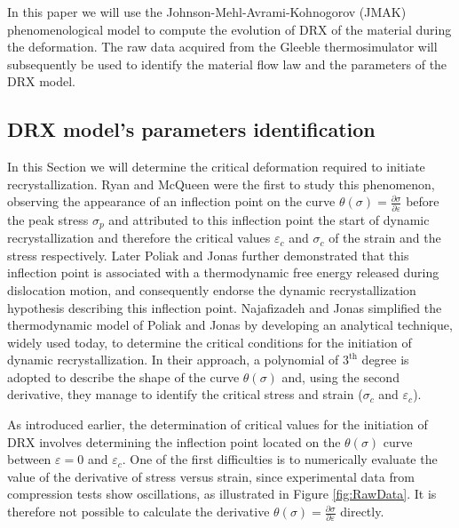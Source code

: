 \documentclass[metals,article,submit,pdftex,moreauthors]{Definitions/mdpi}
\begin{document}
In this paper we will use the Johnson-Mehl-Avrami-Kohnogorov (JMAK) phenomenological model \cite{Avrami-1939} to compute the evolution of DRX of the material during the deformation.
The raw data acquired from the Gleeble thermosimulator will subsequently be used to identify the material flow law and the parameters of the DRX model.

\subsection{DRX model's parameters identification\label{subsec:DRXParameters}}

In this Section we will determine the critical deformation required to initiate recrystallization.
Ryan and McQueen \cite{Ryan-1989, Ryan-1990, Ryan-1990-2} were the first to study this phenomenon, observing the appearance of an inflection point on the curve $\theta(\sigma)=\frac{\partial \sigma}{\partial \varepsilon}$ before the peak stress $\sigma_p$ and attributed to this inflection point the start of dynamic recrystallization and therefore the critical values $\varepsilon_c$ and $\sigma_c$ of the strain and the stress respectively.
Later Poliak and Jonas \cite{Poliak-1996, Poliak-2003, Poliak-2003-2, Jonas-2003} further demonstrated that this inflection point is associated with a thermodynamic free energy released during dislocation motion, and consequently endorse the dynamic recrystallization hypothesis describing this inflection point.
Najafizadeh and Jonas \cite{Najafizadeh-2006} simplified the thermodynamic model of Poliak and Jonas by developing an analytical technique, widely used today, to determine the critical conditions for the initiation of dynamic recrystallization.
In their approach, a polynomial of $3^\text{th}$ degree is adopted to describe the shape of the curve $\theta(\sigma)$ and, using the second derivative, they manage to identify the critical stress and strain ($\sigma_c$ and $\varepsilon_c$).

As introduced earlier, the determination of critical values for the initiation of DRX involves determining the inflection point located on the $\theta(\sigma)$ curve between $\varepsilon=0$ and $\varepsilon_c$.
One of the first difficulties is to numerically evaluate the value of the derivative of stress versus strain, since experimental data from compression tests show oscillations, as illustrated in Figure \ref{fig:RawData}.
It is therefore not possible to calculate the derivative $\theta(\sigma)=\frac{\partial \sigma}{\partial \varepsilon}$ directly.
\end{document}
